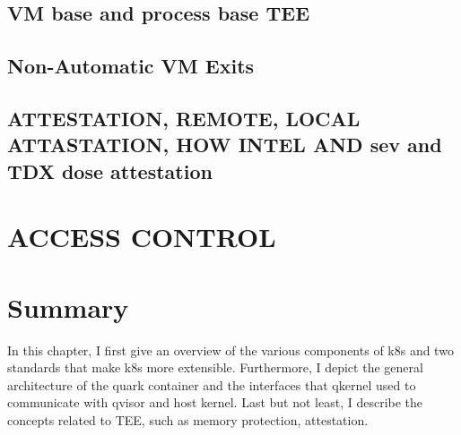 \subsection{VM base and process base TEE}
\subsection{Non-Automatic VM Exits}
\subsection{ATTESTATION, REMOTE, LOCAL ATTASTATION, HOW INTEL AND sev and TDX dose attestation}

\section{ACCESS CONTROL}


\section{Summary}
In this chapter, I first give an overview of the various components of k8s and two standards that make k8s more extensible. Furthermore, I depict the general architecture of the quark container 
and the interfaces that qkernel used to communicate with qvisor and host kernel. Last but not least, I describe the concepts related to TEE, such as memory protection, attestation.

\cleardoublepage

